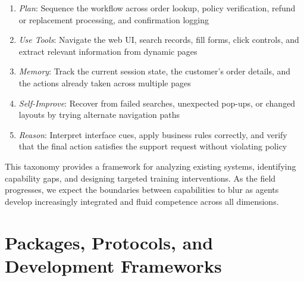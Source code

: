 \begin{enumerate}
    \item \textit{Plan}: Sequence the workflow across order lookup, policy verification, refund or replacement processing, and confirmation logging
    \item \textit{Use Tools}: Navigate the web UI, search records, fill forms, click controls, and extract relevant information from dynamic pages
    \item \textit{Memory}: Track the current session state, the customer's order details, and the actions already taken across multiple pages
    \item \textit{Self-Improve}: Recover from failed searches, unexpected pop-ups, or changed layouts by trying alternate navigation paths
    \item \textit{Reason}: Interpret interface cues, apply business rules correctly, and verify that the final action satisfies the support request without violating policy

\end{enumerate}
This taxonomy provides a framework for analyzing existing systems, identifying capability gaps, and designing targeted training interventions. As the field progresses, we expect the boundaries between capabilities to blur as agents develop increasingly integrated and fluid competence across all dimensions.
\section{Packages, Protocols, and Development Frameworks}

